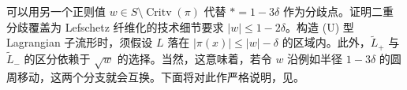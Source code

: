 可以用另一个正则值 $w\in S\setminus\operatorname{Critv}(\pi)$ 代替 $*=1-3\delta$ 作为分歧点。证明二重分歧覆盖为 Lefschetz 纤维化的技术细节要求 $|w|\le1-2\delta$。构造 (U) 型 Lagrangian 子流形时，须假设 $L$ 落在
$|\pi(x)|\le|w|-\delta$ 的区域内。此外，$\widetilde L_+$ 与 $\widetilde L_-$ 的区分依赖于 $\sqrt w$ 的选择。当然，这意味着，若令 $w$ 沿例如半径 $1-3\delta$ 的圆周移动，这两个分支就会互换。下面将对此作严格说明，见。
